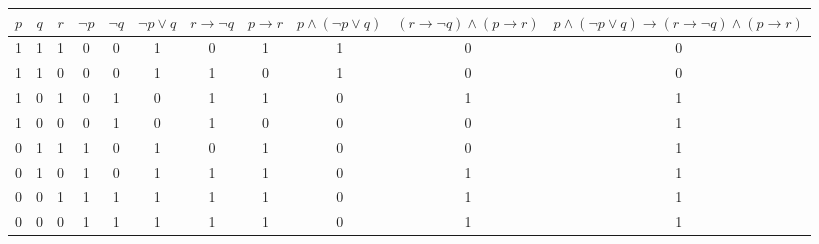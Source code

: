 \begin{landscape}
\begin{tabular}{ccc|c|c|c|c|c|c|c|c|}

$p$&$q$&$r$& $\neg p$ & $\neg q$ & $\neg p\lor q$ & $r\to\neg q$ & $p\to r$ & $p\land (\neg p\lor q)$ & ${(r \to \neg q) \land (p \to r)}$ & ${p \land (\neg p \lor q) \to (r \to \neg q) \land (p \to r)}$ \\
\hline
 1 & 1 & 1 & 0 &  0 &1 &0 &1 &1 &0 &0 \\\hline
 1 & 1 & 0 & 0 & 0 &1 &1 &0 &1 &0 &0 \\\hline
 1 & 0 & 1 & 0 & 1 &0 &1 &1 &0 &1 &1\\\hline
 1 & 0 & 0 & 0 & 1 &0 &1 &0 &0 &0 &1\\\hline
 0 & 1 & 1 &  1 &0 &1 &0 &1 &0 &0 &1\\\hline
 0 & 1 & 0 & 1 & 0 &1 &1 &1 &0 &1 &1\\\hline
 0 & 0 & 1 & 1 & 1 &1 &1 &1 &0 &1 &1\\\hline
 0 & 0 & 0 & 1 & 1 &1 &1 &1 &0 &1 &1\\\hline
\end{tabular}
\end{landscape}
			
